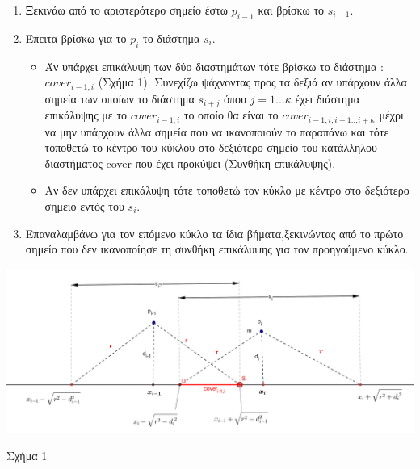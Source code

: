 \documentclass[12pt,a4paper]{article}
\begin{document}
\begin{enumerate}
    \item Ξεκινάω από το αριστερότερο σημείο έστω $p_{i-1}$ και βρίσκω το $s_{i-1}$.
    \item Έπειτα βρίσκω για το $p_i$ το διάστημα $s_i$. 
    \begin{itemize}
        \item Άν υπάρχει επικάλυψη των δύο διαστημάτων τότε βρίσκω το διάστημα : $cover_{i-1,i}$ (Σχήμα 1). Συνεχίζω ψάχνοντας προς τα δεξιά αν υπάρχουν άλλα σημεία των οποίων το διάστημα $s_{i+j}$ όπου $j=1...κ$ έχει διάστημα επικάλυψης με το $cover_{i-1,i}$ το οποίο θα είναι το $cover_{i-1,i,i+1...i+κ}$ μέχρι να μην υπάρχουν άλλα σημεία που να ικανοποιούν το παραπάνω και τότε τοποθετώ το κέντρο του κύκλου στο δεξιότερο σημείο του κατάλληλου διαστήματος cover που έχει προκύψει (Συνθήκη επικάλυψης).
        \item Aν δεν υπάρχει επικάλυψη τότε τοποθετώ τον κύκλο με κέντρο στο δεξιότερο σημείο εντός του $s_i$.
    \end{itemize}
    \item Επαναλαμβάνω για τον επόμενο κύκλο τα ίδια βήματα,ξεκινώντας από το πρώτο σημείο που δεν ικανοποίησε τη συνθήκη επικάλυψης για τον προηγούμενο κύκλο.
\end{enumerate}

\begin{center}
\includegraphics[scale=1.3]{images/geogebra-export (3).png}
\centering
\caption{Σχήμα 1}
\end{center}
\end{document}
